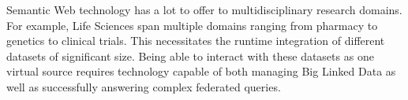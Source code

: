 
Semantic Web technology has a lot to offer to multidisciplinary research domains.
For example, Life Sciences span multiple domains ranging from pharmacy to genetics to clinical trials.
This necessitates the runtime integration of different datasets of significant size. 
Being able to interact with these datasets as one virtual source requires technology capable of both managing Big Linked Data as well as successfully answering complex federated queries.


